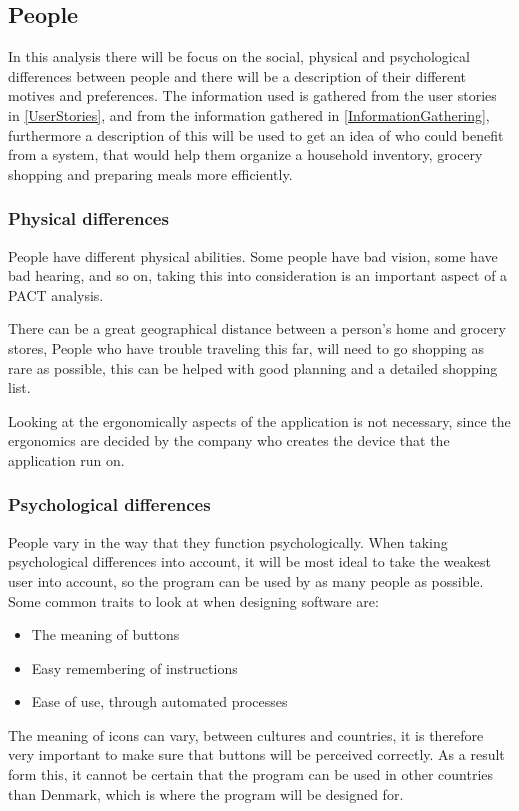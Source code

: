 \subsection{People} 
In this analysis there will be focus on the social, physical and psychological differences between people and there will be a description of their different motives and preferences. The information used is gathered from the user stories in \cref{UserStories}, and from the information gathered in \cref{InformationGathering}, furthermore a description of this will be used to get an idea of who could benefit from a system, that would help them organize a household inventory, grocery shopping and preparing meals more efficiently.

\subsubsection{Physical differences}
People have different physical abilities. Some people have bad vision, some have bad hearing, and so on, taking this into consideration is an important aspect of a PACT analysis.

There can be a great geographical distance between a person's home and grocery stores, People who have trouble traveling this far, will need to go shopping as rare as possible, this can be helped with good planning and a detailed shopping list.

Looking at the ergonomically aspects of the application is not necessary, since the ergonomics are decided by the company who creates the device that the application run on.

\subsubsection{Psychological differences}
People vary in the way that they function psychologically. When taking psychological differences into account, it will be most ideal to take the weakest user into account, so the program can be used by as many people as possible. Some common traits to look at when designing software are:
\begin{itemize}
    \item The meaning of buttons
    \item Easy remembering of instructions
    \item Ease of use, through automated processes
\end{itemize}
The meaning of icons can vary, between cultures and countries, it is therefore very important to make sure that buttons will be perceived correctly. As a result form this, it cannot be certain that the program can be used in other countries than Denmark, which is where the program will be designed for.

